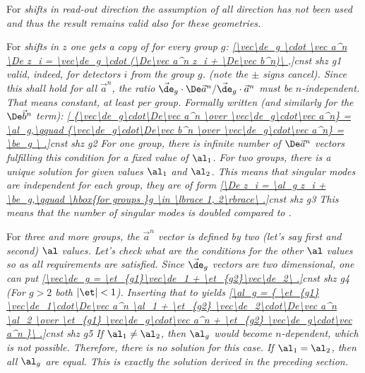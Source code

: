 For \em{shifts in read-out direction} the assumption of all direction has not been used and thus the result  remains valid also for these geometries.

For \em{shifts in $z$} one gets a copy of  for every group $g$:
\eqref{\vec\de_g \cdot \vec a^n \De z_i = \vec\de_g \cdot (\De\vec a^n z_i + \De\vec b^n)\ ,}{cnst shz g1}
valid, indeed, for detectors $i$ from the group $g$. (note the $\pm$ signs cancel). Since this shall hold for all $\vec a^n$, the ratio $\vec\de_g\cdot\De\vec a^n / \vec\de_g\cdot\vec a^n$ must be $n$-independent. That means constant, at least per group. Formally written (and similarly for the $\De\vec b^n$ term):
\eqref{
{\vec\de_g\cdot\De\vec a^n \over \vec\de_g\cdot\vec a^n} = \al_g,\qquad
{\vec\de_g\cdot\De\vec b^n \over \vec\de_g\cdot\vec a^n} = \be_g
\ .}{cnst shz g2}
For \em{one group}, there is infinite number of $\De\vec a^n$ vectors fulfilling this condition for a fixed value of $\al_1$. For \em{two groups}, there is a unique solution for given values $\al_1$ and $\al_2$. This means that singular modes are independent for each group, they are of form
\eqref{\De z_i = \al_g z_i + \be_g,\qquad \hbox{for groups }g \in \lbrace 1, 2\rbrace\ .}{cnst shz g3}
This means that the number of singular modes is doubled compared to .

For \em{three and more groups}, the $\vec a^n$ vector is defined by two (let's say first and second) $\al$ values. Let's check what are the conditions for the other $\al$ values so as all requirements  are satisfied. Since $\vec\de_g$ vectors are two dimensional, one can put
\eqref{\vec\de_g = \et_{g1}\vec\de_1 + \et_{g2}\vec\de_2\ .}{cnst shz g4}
(For $g>2$ both $|\et| < 1$). Inserting that to  yields
\eqref{\al_g = {
\et_{g1} \vec\de_1\cdot\De\vec a^n \al_1 + \et_{g2} \vec\de_2\cdot\De\vec a^n \al_2
\over
\et_{g1} \vec\de_g\cdot\vec a^n + \et_{g2} \vec\de_g\cdot\vec a^n
}\ .}{cnst shz g5}
If $\al_1 \neq \al_2$, then $\al_g$ would become $n$-dependent, which is not possible. Therefore, there is no solution for this case. If $\al_1 = \al_2$, then all $\al_g$ are equal. This is exactly the solution  derived in the preceding section.

